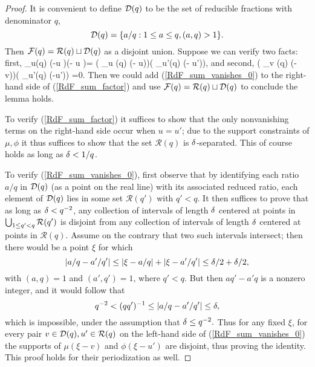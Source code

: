 \documentclass[oneside,11pt]{amsart}
\newcommand{\Rcal}{\mathcal{R}}
\begin{document}
 
 
 \begin{proof}
 It is convenient to define $\mathcal{D}(q)$ to be the set of reducible fractions with denominator $q$,  
 \[ \mathcal{D}(q) = \{ a/q : 1 \leq a \leq q, (a,q)>1\}.\]
 Then   $\Fcal(q) = \Rcal(q) \sqcup \Dcal(q)$ as a disjoint union.  
Suppose we can verify two facts: first,
\beq\label{RdF_sum_factor}
 \sum_{u\in \Rcal(q)} \mu (\xi -u )\phi(\xi - u )= ( \sum_{u \in \Rcal(q) } \mu(\xi - u))\cdot ( \sum_{u'\in \Rcal(q)} \phi(\xi - u')),
 \eeq
 and second, 
\beq\label{RdF_sum_vanishes_0}
 ( \sum_{v \in \Dcal(q)} \mu (\xi - v))\cdot ( \sum_{u'\in \Rcal(q)} \phi(\xi -u')) =0.
\eeq
Then we could add (\ref{RdF_sum_vanishes_0}) to the right-hand side of (\ref{RdF_sum_factor}) and  use $\Fcal(q) = \Rcal(q) \sqcup \Dcal(q)$ to conclude the lemma holds.

To verify (\ref{RdF_sum_factor}) it  suffices to show that  the only nonvanishing terms on the right-hand side occur when $u=u'$; due to the support constraints of $\mu,\phi$ it thus suffices to show that the set $\Rcal(q)$ is $\delta$-separated. This of course holds as long as $\delta<1/q$. 


To verify (\ref{RdF_sum_vanishes_0}), first observe that by identifying each ratio $a/q$ in $\mathcal{D}(q)$ (as a point on the real line) with its associated reduced ratio,   each element of $\mathcal{D}(q)$ lies in some set $\Rcal(q')$ with $q'<q$.
It  then suffices to prove that as long as $\delta<  q^{-2}$,   any collection of intervals of length $\delta$ centered at points in $\Union_{1 \leq q' < q} \Rcal(q')$  is disjoint from any collection of intervals of length $\delta$ centered at points in $\Rcal(q)$. 
Assume on the contrary that two such intervals intersect; then there would be a point $\xi$ for which 
\[ |a/q - a'/q'| \leq |\xi - a/q| + |\xi - a'/q'| \leq \delta/2 + \delta/2,\]
with $(a,q)=1$ and $(a',q')=1$, where $q' < q$. But then $aq' - a'q$ is a nonzero integer, and it would follow that
\[ q^{-2} < (qq')^{-1} \leq |a/q-a'/q' |\leq \delta,\]
 which is impossible, under the assumption that $\delta \leq  q^{-2}.$
Thus for any fixed $\xi$, for every pair $v \in \Dcal(q), u' \in \Rcal(q)$ on the left-hand side of (\ref{RdF_sum_vanishes_0}) the supports of $\mu(\xi - v)$ and $\phi(\xi - u')$ are disjoint,   thus proving the identity. This proof holds for their periodization as well. 
\end{proof}
\end{document}
